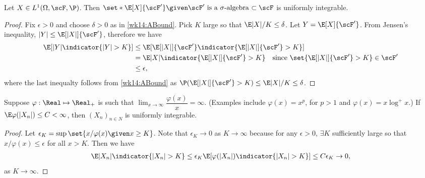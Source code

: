 \documentclass[../aipt.tex]{subfiles}
\begin{document}
\begin{Proposition}
Let $X \in L^1(\Omega,\scF,\P)$. Then $\set*{\E[X]{\scF'} \given \text{$\scF'$ is a $\sigma$-algebra $\subset \scF$}}$ is uniformly integrable. 
\end{Proposition}
\begin{proof}
Fix $\epsilon>0$ and choose $\delta>0$ as in \cref{wk14:ABound}. Pick $K$ large so that $\E|X|/K \leq \delta$. Let $Y=\E[X]{\scF'}$. From Jensen's inequality, $|Y| \leq \E[|X|]{\scF'}$, therefore we have
\begin{align*}
\E[|Y|\indicator{|Y|>K}] 
&\leq \E[ \E[|X|]{\scF'} \indicator{\E[|X|]{\scF'} > K}] \\
&= \E|X|\indicator{\E[|X|]{\scF'} > K}\quad \text{since $\set{\E[|X|]{\scF'} > K} \in \scF'$} \\
&\leq \epsilon,
\end{align*}
where the last inequalty follows from \cref{wk14:ABound} as $\P(\E[|X|]{\scF'} > K) \leq \E|X|/K \leq \delta$.
\end{proof}

\begin{Proposition}
Suppose $\varphi : \Real\mapsto\Real_+$ is such that $\lim_{x\to\infty} \dfrac{\varphi(x)}{x} = \infty$. (Examples include $\varphi(x)=x^p$, for $p>1$ and $\varphi(x)=x\log^{+}x$.) If $\E\varphi(|X_n|) \leq C <\infty$, then $(X_n)_{n\in N}$ is uniformly integrable.
\end{Proposition}
\begin{proof}
Let $\epsilon_K = \sup\set{x/\varphi(x)\given x\geq K}$. Note that $\epsilon_K\to 0$ as $K\to\infty$ because for any $\epsilon>0$, $\exists K$ sufficiently large so that $x/\varphi(x) \leq \epsilon$ for all $x>K$. Then we have
\begin{align*}
\E|X_n|\indicator{|X_n|>K} \leq \epsilon_{K} \E[\varphi(|X_n|)\indicator{|X_n|>K}] \leq C\epsilon_K \to 0,
\end{align*}
as $K\to\infty$.
\end{proof}
\end{document}
